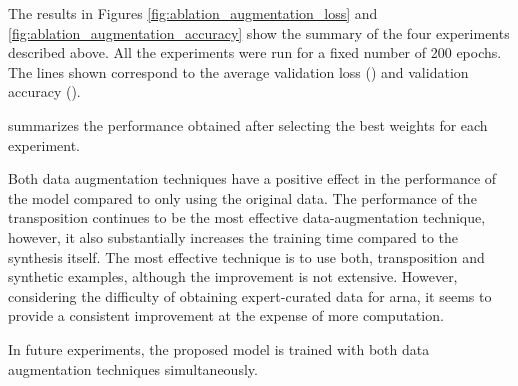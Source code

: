 
The results in Figures \ref{fig:ablation_augmentation_loss}
and \ref{fig:ablation_augmentation_accuracy} show the
summary of the four experiments described above. All the
experiments were run for a fixed number of 200 epochs. The
lines shown correspond to the average validation loss
() and validation
accuracy ().

summarizes the performance obtained after selecting the best
weights for each experiment.




Both data augmentation techniques have a positive effect in
the performance of the model compared to only using the
original data. The performance of the transposition
continues to be the most effective data-augmentation
technique, however, it also substantially increases the
training time compared to the synthesis itself. The most
effective technique is to use both, transposition and
synthetic examples, although the improvement is not
extensive. However, considering the difficulty of obtaining
expert-curated data for \gls{arna}, it seems to provide a
consistent improvement at the expense of more computation.

In future experiments, the proposed model is trained with
both data augmentation techniques simultaneously.
